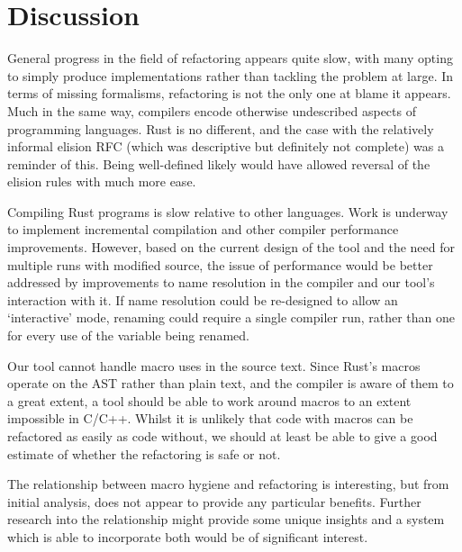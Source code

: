 \section{Discussion}



General progress in the field of refactoring appears quite slow, with many opting to simply produce implementations rather than tackling the problem at large. In terms of missing formalisms, refactoring is not the only one at blame it appears. Much in the same way, compilers encode otherwise undescribed aspects of programming languages. Rust is no different, and the case with the relatively informal elision RFC (which was descriptive but definitely not complete) was a reminder of this. Being well-defined likely would have allowed reversal of the elision rules with much more ease.

Compiling Rust programs is slow relative to other languages. Work is underway to implement incremental compilation and other compiler performance improvements. However, based on the current design of the tool and the need for multiple runs with modified source, the issue of performance would be better addressed by improvements to name resolution in the compiler and our tool's interaction with it. If name resolution could be re-designed to allow an `interactive' mode, renaming could require a single compiler run, rather than one for every use of the variable being renamed.

Our tool cannot handle macro uses in the source text. Since Rust's macros operate on the AST rather than plain text, and the compiler is aware of them to a great extent, a tool should be able to work around macros to an extent impossible in C/C++. Whilst it is unlikely that code with macros can be refactored as easily as code without, we should at least be able to give a good estimate of whether the refactoring is safe or not. 

The relationship between macro hygiene and refactoring is interesting, but from initial analysis, does not appear to provide any particular benefits. Further research into the relationship might provide some unique insights and a system which is able to incorporate both would be of significant interest.
